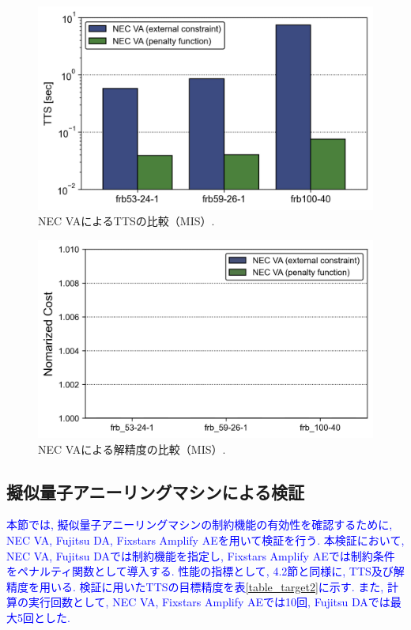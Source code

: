 \documentclass[submit,techrep,noauthor]{ipsj}
\begin{document}
\begin{figure}[ht]
\centering
\includegraphics[bb=0 0 700 230, width=15cm]{TTS_MIS_VA.png}
\caption{NEC VAによるTTSの比較（MIS）.}
\label{TTS_MIS_VA}
\end{figure}

\begin{figure}[ht]
\centering
\includegraphics[bb=0 0 700 230, width=15cm]{Cost_MIS_VA.png}
\caption{NEC VAによる解精度の比較（MIS）.}
\label{Cost_MIS_VA}
\end{figure}

\subsection{擬似量子アニーリングマシンによる検証}
\textcolor{blue}{本節では, 擬似量子アニーリングマシンの制約機能の有効性を確認するために, NEC VA, Fujitsu DA, Fixstars Amplify AEを用いて検証を行う. 本検証において, NEC VA, Fujitsu DAでは制約機能を指定し, Fixstars Amplify AEでは制約条件をペナルティ関数として導入する. 性能の指標として, 4.2節と同様に, TTS及び解精度を用いる. 検証に用いたTTSの目標精度を表\ref{table_target2}に示す. また, 計算の実行回数として, NEC VA, Fixstars Amplify AEでは10回, Fujitsu DAでは最大5回とした.}
\end{document}
